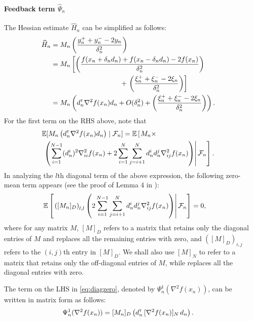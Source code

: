 \documentclass[letterpaper, 10 pt, conference]{ieeeconf}  %
\begin{document}
\paragraph{\textbf{Feedback term }$\widehat \Psi_n$}
The Hessian estimate $\widehat H_n$ can be simplified as follows: 
\begin{align}
\widehat H_n & = M_n \left(\dfrac{y_n^+ + y_n^- - 2 y_n}{\delta_n^2}\right) \nonumber \\
& =  M_n \left[\left(\dfrac{f(x_n+\delta_n d_n) + f(x_n-\delta_n d_n) - 2 f(x_n)}{\delta_n^2}\right) \right.\nonumber \\&\hspace{10em}+\left. \left(\dfrac{\xi_n^+ + \xi_n^- - 2 \xi_n}{\delta_n^2}\right)\right] \nonumber \\
& = M_n \left(d_n\tr \nabla^2 f(x_n) d_n +  O(\delta_n^2) + \left(\dfrac{\xi_n^+ + \xi_n^- - 2 \xi_n}{\delta_n^2} \right)\right).\label{eq:h0}
\end{align}
For the first term on the RHS above, note that 
\begin{align}
&\mathbb{E}[M_n \left(d_n^\mathsf{\scriptscriptstyle T} \nabla^2 f(x_n) d_n\right) \mid \mathcal{F}_n] =   \mathbb{E}\left[\left. M_n \times\right.\right.\nonumber\\
&\left.\left.\left(\sum\limits_{i=1}^{N-1} (d_n^i)^2 \nabla^2_{ii} f(x_n) + 2\sum\limits_{i=1}^N\sum\limits_{j=i+1}^N d_n^i d_n^j \nabla^2_{ij} f(x_n) \right)\right| \mathcal{F}_n\right]. \label{eq:h1}
\end{align}
In analyzing the $l$th diagonal term of the above expression, the following zero-mean term appears (see the proof of Lemma 4 in \cite{prashanth2015rdsa}):
\begin{align}
& \mathbb{E}\left[\left. \left([M_n]_{D}\right)_{l,l} \left(2\sum\limits_{i=1}^{N-1}\sum\limits_{j=i+1}^N d_n^i d_n^j \nabla^2_{ij} f(x_n)\right)\right| \mathcal{F}_{n}\right] = 0,\label{eq:diagzero}
\end{align}
where for any matrix $M$, $[M]_{D}$ refers to a matrix that retains only the diagonal entries of $M$ and replaces all the remaining  entries with zero, and $\left([M]_{D}\right)_{i,j}$ refers to the $(i,j)$th entry in $[M]_D$. We shall also use $[M]_{N}$ to refer to a matrix that retains only the off-diagonal entries of $M$, while replaces all the diagonal entries with zero.

The term on the LHS in \eqref{eq:diagzero}, denoted by $\Psi_{n}^{1}(\nabla^2 f(x_n))$, can be written in matrix form as follows: 
\begin{align}\label{eq:digmat}
\Psi_{n}^{1}(\nabla^2 f(x_n)) = [M_n]_{D}\left(d_{n}^\mathsf{\scriptscriptstyle T} \, [\nabla^2 f(x_n)]_{N} \, d_{n}\right).
\end{align}
\end{document}
